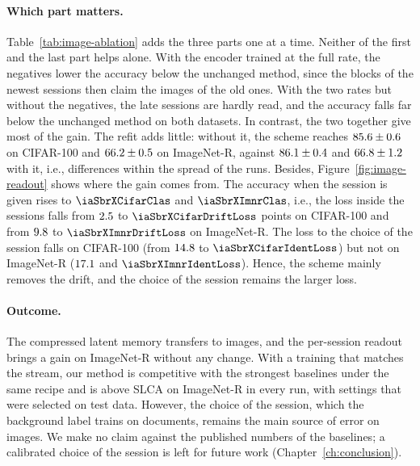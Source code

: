 \paragraph{Which part matters.} Table~\ref{tab:image-ablation} adds the three parts one at
a time. Neither of the first and the last part helps alone. With the encoder trained at the
full rate, the negatives lower the accuracy below the unchanged method, since the blocks of
the newest sessions then claim the images of the old ones. With the two rates but
without the negatives, the late sessions are hardly read, and the accuracy falls far
below the unchanged method on both datasets. In contrast, the two together give most of the gain.
The refit adds little: without it, the scheme reaches $85.6\pm0.6$ on
CIFAR-100 and $66.2\pm0.5$ on ImageNet-R, against
$86.1\pm0.4$ and $66.8\pm1.2$ with it, i.e., differences
within the spread of the runs. Besides, Figure~\ref{fig:image-readout} shows where the gain comes
from. The accuracy when the session is given rises to $\iaSbrXCifarClas$ and
$\iaSbrXImnrClas$, i.e., the loss inside the sessions falls from $2.5$ to
$\iaSbrXCifarDriftLoss$ points on CIFAR-100 and from $9.8$ to
$\iaSbrXImnrDriftLoss$ on ImageNet-R. The loss to the choice of the session falls on
CIFAR-100 (from $14.8$ to $\iaSbrXCifarIdentLoss$) but not on ImageNet-R
($17.1$ and $\iaSbrXImnrIdentLoss$). Hence, the scheme mainly removes the
drift, and the choice of the session remains the larger loss.

\paragraph{Outcome.} The compressed latent memory transfers to images, and the per-session
readout brings a gain on ImageNet-R without any change. With a training that matches the
stream, our method is competitive with the strongest baselines under the same recipe and
is above SLCA on ImageNet-R in every run, with settings that were selected on test data.
However, the choice of the session, which the background label
trains on documents, remains the main source of error on images. We make no claim against
the published numbers of the baselines; a calibrated choice of the session is left for
future work (Chapter~\ref{ch:conclusion}).

